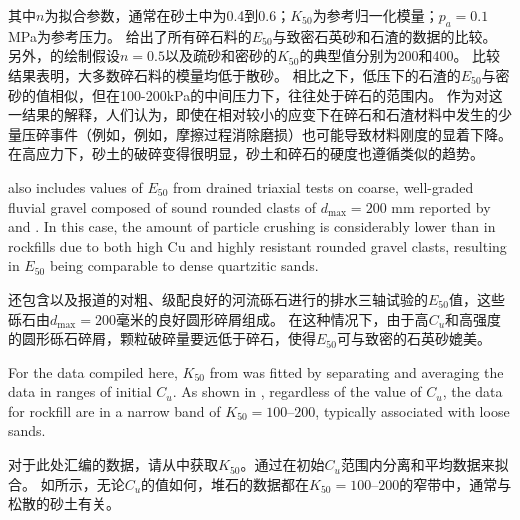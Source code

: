\begin{ParaColumn}
    \switchcolumn

    \noindent
    其中$n$为拟合参数，通常在砂土中为0.4到0.6\citep{Schanz1998383,Schanz1999281}；$K_{50}$为参考归一化模量；$p_a=0.1$MPa为参考压力。 给出了所有碎石料的$E_{50}$与致密石英砂和石渣的数据的比较。 另外，的绘制假设$n=0.5$以及疏砂和密砂的$K_{50}$的典型值分别为200和400\citep{Schanz1998383}。 比较结果表明，大多数碎石料的模量均低于散砂。 相比之下，低压下的石渣的$E_{50}$与密砂的值相似，但在100-200kPa的中间压力下，往往处于碎石的范围内。 作为对这一结果的解释，人们认为，即使在相对较小的应变下在碎石和石渣材料中发生的少量压碎事件（例如，例如，摩擦过程消除磨损）也可能导致材料刚度的显着下降。 在高应力下，砂土的破碎变得很明显，砂土和碎石的硬度也遵循类似的趋势。

    \CrossColumnText{
        
    }

    \switchcolumn*

     also includes values of $E_{50}$ from drained triaxial tests on coarse, well-graded fluvial gravel composed of sound rounded clasts of $d_{\max}=200$ mm reported by \citet{DelaHozAlvarez2007} and \citet{Verdugo2007243}. In this case, the amount of particle crushing is considerably lower than in rockfills due to both high Cu and highly resistant rounded gravel clasts, resulting in $E_{50}$ being comparable to dense quartzitic sands.

    \switchcolumn

    还包含\citet{DelaHozAlvarez2007}以及\citet{Verdugo2007243}报道的对粗、级配良好的河流砾石进行的排水三轴试验的$E_{50}$值，这些砾石由$d_{\max}=200$毫米的良好圆形碎屑组成。 在这种情况下，由于高$C_u$和高强度的圆形砾石碎屑，颗粒破碎量要远低于碎石，使得$E_{50}$可与致密的石英砂媲美。

    \switchcolumn*

    For the data compiled here, $K_{50}$ from  was fitted by separating and averaging the data in ranges of initial $C_u$. As shown in , regardless of the value of $C_u$, the data for rockfill are in a narrow band of $K_{50}=100–200$, typically associated with loose sands.

    \switchcolumn

    对于此处汇编的数据，请从中获取$K_{50}$。通过在初始$C_u$范围内分离和平均数据来拟合。 如所示，无论$C_u$的值如何，堆石的数据都在$K_{50}=100–200$的窄带中，通常与松散的砂土有关。
    
\end{ParaColumn}